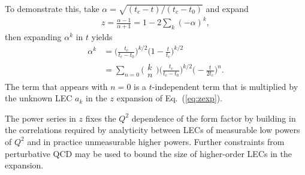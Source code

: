 To demonstrate this, take $\alpha=\sqrt{(t_c-t)/(t_c-t_0)}$ and expand
\begin{align}
 z = \frac{\alpha-1}{\alpha+1} = 1 - 2 \sum_k (-\alpha)^k,
\end{align}
 then expanding $\alpha^k$ in $t$ yields
\begin{align}
 \alpha^k &= \biggr(\frac{ t_c}{ t_c -t_0} \biggr)^{k/2} \biggr( 1 -\frac{t}{t_c} \biggr)^{k/2}
 \nonumber\\
 &= \sum_{n=0} \biggr(\begin{array}{c} k \\ n \end{array} \biggr)
 \biggr(\frac{ t_c}{ t_c -t_0} \biggr)^{k/2} \biggr( -\frac{t}{2t_c} \biggr)^{n}.
\end{align}
The term that appears with $n=0$ is a $t$-independent term that is multiplied by
 the unknown LEC $a_k$ in the $z$ expansion of Eq.~(\ref{eq:zexp}).

The power series in $z$ fixes the $Q^2$ dependence of the form factor
 by building in the correlations required by analyticity
 between LECs of measurable low powers of $Q^2$
 and in practice unmeasurable higher powers.
Further constraints from perturbative QCD may be used to bound the size of higher-order LECs
 in the expansion.
